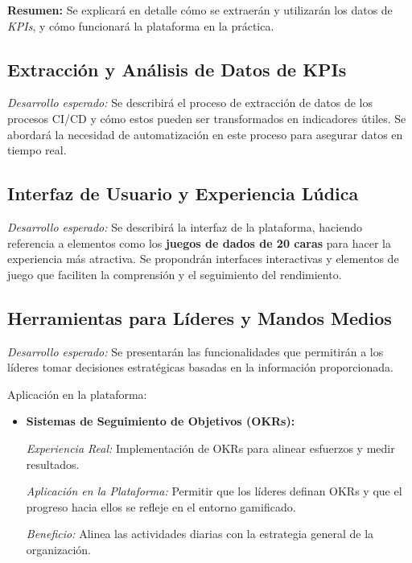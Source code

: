 \documentclass[journal]{IEEEtran}
\begin{document}
\textbf{Resumen:} Se explicará en detalle cómo se extraerán y utilizarán los datos de \textit{KPIs}, y cómo funcionará la plataforma en la práctica.

\subsection{\textbf{Extracción y Análisis de Datos de KPIs}}

\textit{Desarrollo esperado:} Se describirá el proceso de extracción de datos de los procesos CI/CD y cómo estos pueden ser transformados en indicadores útiles. Se abordará la necesidad de automatización en este proceso para asegurar datos en tiempo real.

\subsection{\textbf{Interfaz de Usuario y Experiencia Lúdica}}

\textit{Desarrollo esperado:} Se describirá la interfaz de la plataforma, haciendo referencia a elementos como los \textbf{juegos de dados de 20 caras} para hacer la experiencia más atractiva. Se propondrán interfaces interactivas y elementos de juego que faciliten la comprensión y el seguimiento del rendimiento.

\subsection{\textbf{Herramientas para Líderes y Mandos Medios}}

\textit{Desarrollo esperado:} Se presentarán las funcionalidades que permitirán a los líderes tomar decisiones estratégicas basadas en la información proporcionada.

Aplicación en la plataforma:

\begin{itemize}
    \item \textbf{Sistemas de Seguimiento de Objetivos (OKRs):}
    
    \textit{Experiencia Real:} Implementación de OKRs para alinear esfuerzos y medir resultados.
    
    \textit{Aplicación en la Plataforma:} Permitir que los líderes definan OKRs y que el progreso hacia ellos se refleje en el entorno gamificado.
    
    \textit{Beneficio:} Alinea las actividades diarias con la estrategia general de la organización.
\end{itemize}
\end{document}
